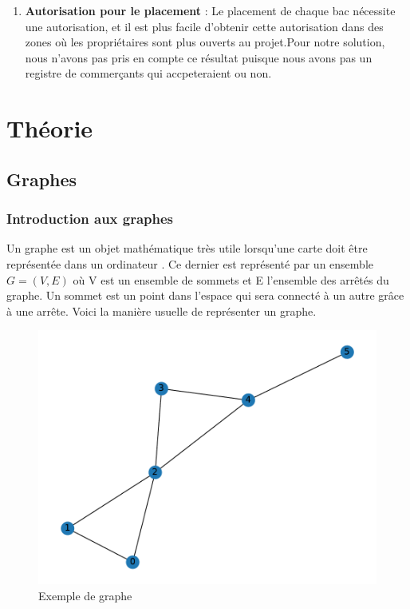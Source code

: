\documentclass[11pt]{article}
\begin{document}
\begin{enumerate}
    \item\textbf{Autorisation pour le placement} : Le placement de chaque bac nécessite une autorisation, et il est plus facile d’obtenir cette autorisation dans des zones où les propriétaires sont plus ouverts au projet.Pour notre solution, nous n'avons pas pris en compte ce résultat puisque nous avons pas un registre de commerçants qui accpeteraient ou non.
\end{enumerate}

\section{Théorie}
\subsection{Graphes}
\subsubsection{Introduction aux graphes}
Un graphe est un objet mathématique très utile lorsqu'une carte doit être représentée dans un ordinateur \cite{mackaness_use_1993}\cite{riaz_applications_2011}. Ce dernier est représenté par un ensemble $G=(V,E)$ où V est un ensemble de sommets et E l'ensemble des arrêtés du graphe. Un sommet est un point dans l'espace qui sera connecté à un autre grâce à une arrête. Voici la manière usuelle de représenter un graphe.

\begin{figure}[H]
    \centering
        \includegraphics[width=0.45\linewidth]{images/graphe_MIS_exemple.pdf}
        \caption{Exemple de graphe}
    \label{graph_exemple}
\end{figure}
\end{document}
